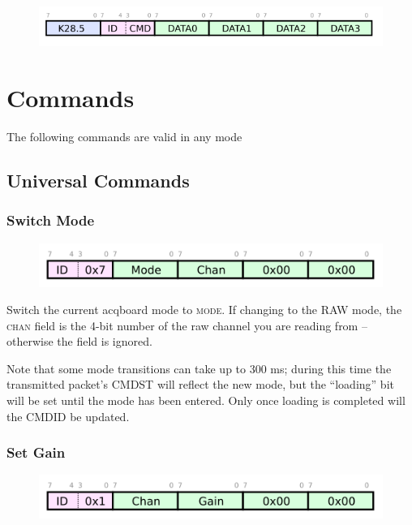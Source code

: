 \begin{figure}[h!]
\includegraphics[scale=1.0]{rxpacket.svg}
\end{figure}

\section{Commands}

The following commands are valid in any mode

\subsection{Universal Commands}

\subsubsection{Switch Mode}
\begin{figure}[h!]
\includegraphics[scale=1.0]{switchmode.cmd.svg}
\end{figure}

Switch the current acqboard mode to \textsc{mode}. If changing to the RAW mode, the \textsc{chan} field is the 4-bit number of the raw channel you are reading from -- otherwise the field is ignored. 

Note that some mode transitions can take up to 300 ms; during this time the transmitted packet's CMDST will reflect the new mode, but the ``loading'' bit will be set until the mode has been entered. Only once loading is completed will the CMDID be updated. 

\subsubsection{Set Gain}
\begin{figure}[h!]
\includegraphics[scale=1.0]{setgain.cmd.svg}
\end{figure}


